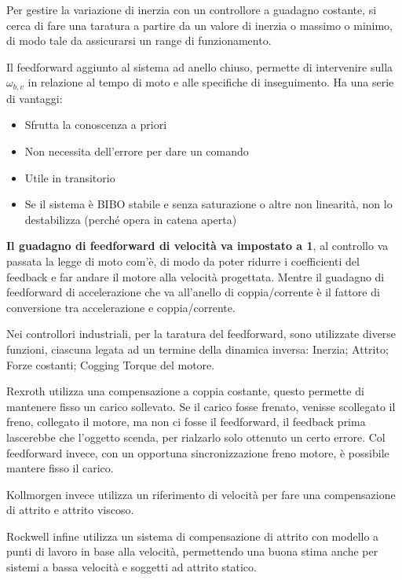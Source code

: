 Per gestire la variazione di inerzia con un controllore a guadagno costante, si cerca di fare una taratura a partire da un valore di inerzia o massimo o minimo, di modo tale da assicurarsi un range di funzionamento.

Il feedforward aggiunto al sistema ad anello chiuso, permette di intervenire sulla \(\omega_{b,v}\) in relazione al tempo di moto e alle specifiche di inseguimento.
Ha una serie di vantaggi:
\begin{itemize}
    \item Sfrutta la conoscenza a priori
    \item Non necessita dell'errore per dare un comando
    \item Utile in transitorio
    \item Se il sistema è BIBO stabile e senza saturazione o altre non linearità, non lo destabilizza (perché opera in catena aperta)
\end{itemize}

\textbf{Il guadagno di feedforward di velocità va impostato a 1}, al controllo va passata la legge di moto com'è, di modo da poter ridurre i coefficienti del feedback e far andare il motore alla velocità progettata.
Mentre il guadagno di feedforward di accelerazione che va all'anello di coppia/corrente è il fattore di conversione tra accelerazione e coppia/corrente.

Nei controllori industriali, per la taratura del feedforward, sono utilizzate diverse funzioni, ciascuna legata ad un termine della dinamica inversa: Inerzia; Attrito; Forze costanti; Cogging Torque del motore.

Rexroth utilizza una compensazione a coppia costante, questo permette di mantenere fisso un carico sollevato. Se il carico fosse frenato, venisse scollegato il freno, collegato il motore, ma non ci fosse il feedforward, il feedback prima lascerebbe che l'oggetto scenda, per rialzarlo solo ottenuto un certo errore. Col feedforward invece, con un opportuna sincronizzazione freno motore, è possibile mantere fisso il carico.

Kollmorgen invece utilizza un riferimento di velocità per fare una compensazione di attrito e attrito viscoso.

Rockwell infine utilizza un sistema di compensazione di attrito con modello a punti di lavoro in base alla velocità, permettendo una buona stima anche per sistemi a bassa velocità e soggetti ad attrito statico.

